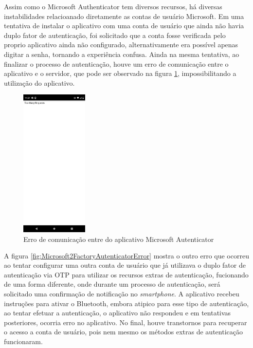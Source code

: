 \documentclass[12pt]{article}
\begin{document}
Assim como o Microsoft Authenticator tem diversos recursos, há diversas instabilidades
relacioanado diretamente as contas de usuário Microsoft.
Em uma tentativa de instalar o aplicativo com uma conta de usuário que ainda não havia
duplo fator de autenticação, foi solicitado que a conta fosse verificada pelo proprio
aplicativo ainda não configurado, alternativamente era possível apenas digitar a senha,
tornando a experiência confusa.
Ainda na mesma tentativa, ao finalizar o processo de autenticação, houve um erro de
comunicação entre o aplicativo e o servidor, que pode ser observado na figura
\ref{fig:MicrosoftAutenticatorErrorToManyReequests}, impossibilitando a utilização do
aplicativo.

\begin{figure}[h!]
  \centering
  \includegraphics[width=0.3\textwidth]{./assets/microsoft_error_1.jpg}
  \caption{Erro de comunicação entre do aplicativo Microsoft Autenticator}
  \label{fig:MicrosoftAutenticatorErrorToManyReequests}
\end{figure}

A figura \ref{fig:Microsoft2FactoryAutenticatorError} mostra o outro erro que
ocorreu ao tentar configurar uma outra conta de usuário que já utilizava o duplo fator de
autenticação via OTP para utilizar os recursos extras de autenticação, fucionando de uma forma
diferente, onde durante um processo de autenticação, será solicitado uma confirmação de
notificação no \textit{smartphone}.
A aplicativo recebeu instruções para ativar o Bluetooth, embora atipico para esse tipo
de autenticação, ao tentar efetuar a autenticação, o aplicativo não respondeu e em tentativas
posteriores, ocorria erro no aplicativo.
No final, houve transtornos para recuperar o acesso a conta de usuário, pois nem mesmo os
métodos extras de autenticação funcionaram.
\end{document}
